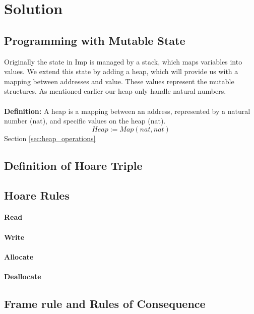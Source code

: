 \section{Solution}
\subsection{Programming with Mutable State}
Originally the state in Imp is managed by a stack, which maps variables into values. We extend this state by adding a heap, which will provide us with a mapping between addresses and value. These values represent the mutable structures. As mentioned earlier our heap only handle natural numbers.

\paragraph{}\textbf{Definition: }A heap is a mapping between an address, represented by a natural number (nat), and specific values on the heap (nat).
\[
Heap := Map(nat, nat)
\]
Section \ref{sec:heap_operations}



\subsection{Definition of Hoare Triple}

\subsection{Hoare Rules}
\paragraph{Read}
\paragraph{Write}
\paragraph{Allocate}
\paragraph{Deallocate}
\subsection{Frame rule and Rules of Consequence}

